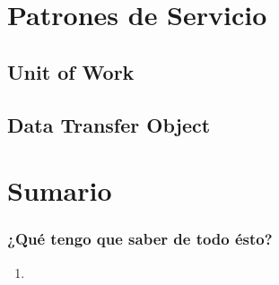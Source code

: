 \documentclass[a4paper,slidestop,xcolor=pst,blue]{beamer}
\begin{document}


\section{Patrones de Servicio}

\subsection{Unit of Work}

\subsection{Data Transfer Object}

\section{Sumario}

\begin{frame}[c]
    \frametitle{¿Qué tengo que saber de todo ésto?}
    \begin{enumerate}[<+->]
        \item
    \end{enumerate}
\end{frame}
\end{document}

